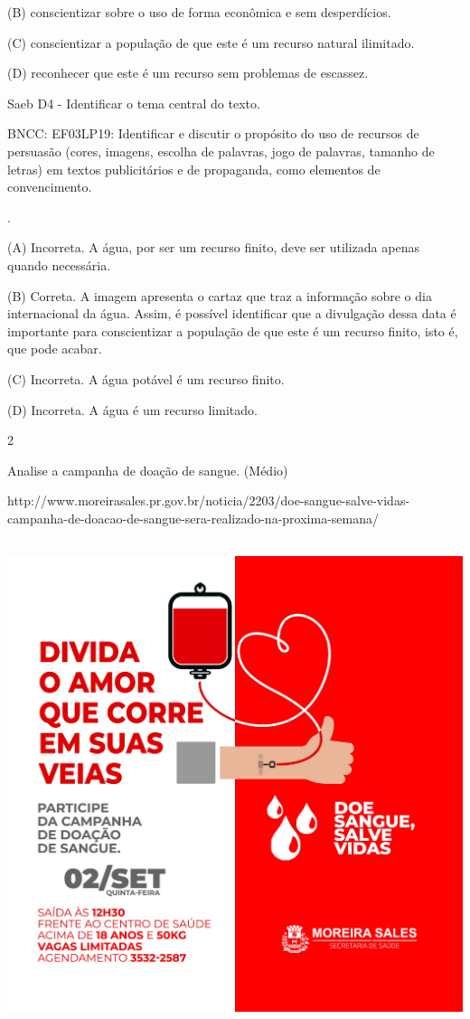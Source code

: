 \begin{itemize}
{{{\begin{itemize}
\begin{itemize}
(B) conscientizar sobre o uso de forma econômica e sem desperdícios.

(C) conscientizar a população de que este é um recurso natural
ilimitado.

(D) reconhecer que este é um recurso sem problemas de escassez.

Saeb D4 - Identificar o tema central do texto.

BNCC: EF03LP19: Identificar e discutir o propósito do uso de recursos de
persuasão (cores, imagens, escolha de palavras, jogo de palavras,
tamanho de letras) em textos publicitários e de propaganda, como
elementos de convencimento.

.

(A) Incorreta. A água, por ser um recurso finito, deve ser utilizada
apenas quando necessária.

(B) Correta. A imagem apresenta o cartaz que traz a informação sobre o
dia internacional da água. Assim, é possível identificar que a
divulgação dessa data é importante para conscientizar a população de que
este é um recurso finito, isto é, que pode acabar.

(C) Incorreta. A água potável é um recurso finito.

(D) Incorreta. A água é um recurso limitado.

\num{2}

Analise a campanha de doação de sangue. (Médio)

http://www.moreirasales.pr.gov.br/noticia/2203/doe-sangue-salve-vidas-campanha-de-doacao-de-sangue-sera-realizado-na-proxima-semana/\includegraphics[width=5.90556in,height=5.90556in]{media/image18.jpeg}


\end{itemize}
\end{itemize}}}}
\end{itemize}
